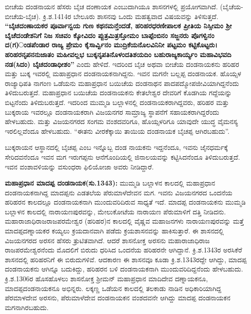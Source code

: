 ಬೀಚೆಯ ದಂಡನಾಯನ ಹೆಸರು ಬೈಚ ದಂಣಾಯಕ ಎಂಬುದಾಗಿಯೂ ಶಾಸನಗಳಲ್ಲಿ ಪ್ರಯೋಗವಾಗಿದೆ. (ಬೈಚೆಯ-ಬೀಚೆಯ-ಬೈಚ). ಕ್ರಿ.ಶ.1414ರ ಬೇಲೂರು ಶಾಸನವು ಒಂದು ಮಹತ್ವವಾದ ವಿಷಯವನ್ನು ತಿಳಿಸುತ್ತದೆ. \textbf{“ಬೈಚದಂಣಾಯಕರ ಪೂರ್ವಾನ್ವಯ ಗುಣ ಕಥನಮನ್ತೆಂದಡೆ, ಹರಿಹರಧರಣೀಪಾಲಕ ಪ್ರೀತಿಯ ನಿಸ್ಸೀಮಂ ಶ‍್ರೀ ಬೈಚೆದಂಡೇಶ\-ನಿಗೆ ನಿಜ ಸಚಿವಂ ಕ್ಕೋವಿದಂ ಪ್ಪುತ್ರಮಿತ್ರಸ್ತೋಮಂ ಬಾಪ್ಪೆಂಬಿನಂ ಸಜ್ಜನರು ಪೊಗಳ್ವಿನಂ ದ(ಗ)ಂಡಪೆಂಡಾರ ರಾಜ್ಯ ಪ್ರೇಮಂ ಕೈಸಾರ್ವ್ವಿನಂ ಮುದ್ರಿಕೆಯನೊಲವಿನಿನೀ ಪಟ್ಟಮಂ ಕಟ್ಟಿಕೊಟ್ಟರು। ಹರಿಹರನೃಪನನುಜಾತಂ ಮಹೀವಲ್ಲಭ ಬುಕ್ಕನೃಪತಿನೊಳಂ\-ದತಿಶಯದಿಂ ಬಹುರಾಜ್ಯಕಾರ್ಯ್ಯಂ ಮಹಾವಿಭವದಿ ನಡ(ಸಿದಂ) ಬೈಚದಂಡಾಧೀಶಂ”} ಎಂದು ಹೇಳಿದೆ. ಇದರಿಂದ ಬೈಚ ಅಥವಾ ಬೀಚೆಯ ದಂಡನಾಯಕನು ಹರಿಹರ ಮತ್ತು ಬುಕ್ಕ ಇವರಲ್ಲಿ ಮಹಾಪ್ರಧಾನ ದಂಡನಾಯಕನಾಗಿದ್ದನು. ಇವನ ಮಗನೇ ಬಲ್ಲಪ್ಪ ದಂಡನಾಯಕ. ಹೊಯ್ಸಳ ರಾಜ್ಯಾಧಿಪತಿ ನಾಗಂಣ ಒಡೆಯನು ಮಹಾಪ್ರಧಾನ ಬಯಿಚೆಯ ದಂಡನಾಥನ ಪಾದಪದ್ಮೋಪಜೀವಿಯಾಗಿದ್ದನೆಂದು ತಿಳಿದುಬರುತ್ತದೆ. ಮಹಾಪ್ರಧಾನ ಬಯಿಚೆಯ ದಂಡನಾಯಕನು ಕೇತಲೇಶ್ವರ ದೇವರಿಗೆ ಕೊಡಗಿಯ ಗದ್ದೆಯನ್ನು ಬಿಟ್ಟನೆಂದು ತಿಳಿದುಬರುತ್ತದೆ. ಇದರಿಂದ ಮುಮ್ಮಡಿ ಬಲ್ಲಾಳನಲ್ಲಿ ದಂಡನಾಯಕರಾಗಿ\-ದ್ದವರು, ಹರಿಹರ ಮತ್ತು ಬುಕ್ಕರಾಯ ಇವರಲ್ಲೂ ದಂಡನಾಯಕರಾಗಿ ವಿಜಯನಗರ ಸಾಮ್ರಾಜ್ಯ ಸ್ಥಾಪನೆಗೆ ಸಹಾಯಕರಾಗಿ\-ದ್ದರೆಂದು ಹೇಳಬಹುದು. ಮತ್ತು ವಿಜಯನಗರದ ಸಂಗಮ ವಂಶದವರಿಗೂ, ಹೊಯ್ಸಳರಿಗೂ ಯಾವುದೇ ಯುದ್ಧ ವೈಮನಸ್ಯ ಇರಲಿಲ್ಲವೆಂದೂ ಹೇಳಬಹುದು. “ಈತನು ವೀರಕೆಕ್ಕಾಯಿ ತಾಯಿಯ ದಂಡನಾಯಕ ಬೈಚಪ್ಪ ಆಗಿರಬಹುದು”.

\vskip 2pt

ಬುಕ್ಕರಾಯನ ಆಸ್ಥಾನದಲ್ಲಿ ಬೈಚಪ್ಪ ಎಂಬ ಇನ್ನೊಬ್ಬ ದಂಡ ನಾಯಕನು ಇದ್ದನೆಂದೂ, ಇವನು ಜೈನಧರ್ಮಕ್ಕೆ ಸೇರಿದವನೆಂದೂ ಇವನ ಮಗ ಇರುಗಪ್ಪನು ಆನೆಗೊಂದಿಯಲ್ಲಿ ಜಿನಾಲಯವನ್ನು ಕಟ್ಟಿಸಿದನೆಂದೂ ತಿಳಿದುಬರುತ್ತದೆ. ಇವನ ವಂಶಾವಳಿಯನ್ನು ವಸುಂಧರಾ ಫಿಲಿಯೋಜಾ ಅವರು ನೀಡಿದ್ದಾರೆ.

\vskip 2pt

\textbf{ಮಹಾಪ್ರಧಾನ ಮಾದಪ್ಪ ದಂಡನಾಯಕ(ಸು.1343):} ಮುಮ್ಮಡಿ ಬಲ್ಲಾಳನ ಕಾಲದಲ್ಲಿ ಮಹಾಪ್ರಧಾನ ದಂಡ\-ನಾಯಕ\-ನಾಗಿದ್ದ ಮಾದಪ್ಪನು ಎಡತಲೆಯ ಪೆರುಮಾಳೆದೇವನ ಮಗ. ಇವನು ವಿಜಯನಗರದ ಒಂದನೆಯ ಹರಿಹರನ ಕಾಲದಲ್ಲೂ ದಂಡನಾಯಕನಾಗಿ ಮುಂದುವರಿದಿರುವ ಸಾಧ್ಯತೆ ಇದೆ. ಮಾದಪ್ಪ ದಂಡನಾಯಕನು ಮುಮ್ಮಡಿ ಬಲ್ಲಾಳನ ಕಾಲದಲ್ಲಿ ನಾರಾಯಣಪುರವನ್ನು, ಮೇಲುಕೋಟೆಯ ನಾರಾಯಣ ಪೆರುಮಾಳಿಗೆ ದತ್ತಿ ನೀಡಿದನು. ಮಹಾರಾಜಾಧಿರಾಜ\break ರಾಜಪರಮೇಶ್ವರ (ಹರಿಹರ)ನ ಕಾಲದಲ್ಲಿ ವೈಷ್ಣವ ಮಹಾಜನಗಳು ನಾರಾಯಣಪುರವನ್ನು ಮತ್ತೆ ಮಾದಪ್ಪದಣ್ನಾಯಕರ ಕಯ್ಯಲು ಕ್ರಯದಾನವಾಗಿ ಪಡೆದು ಕ್ರಯಶಾಸನವನ್ನು ಹಾಕಿಸುತ್ತಾರೆ. ಈ ಶಾಸನದಲ್ಲಿ ವಿಜಯನಗರದ ಅರಸನ ಹೆಸರು ತ್ರುಟಿತವಾಗಿದೆ. ಆದರೆ ಶಾಸನೋಕ್ತ ಅರಸನು ಮಹಾರಾಜಾಧಿರಾಜ ರಾಜಪರಮೇಶ್ವರನೆಂದು ಮೊದಲಿಗೆ ಬಿರುದು ಧರಿಸಿದ ಒಂದನೆಯ ಹರಿಹರನೇ ಆಗಿದ್ದಾನೆ. ಕ್ರಿ.ಶ.1343ರ ಅರಸಿಕೆರೆ ಶಾಸನದಲ್ಲಿ ಹರಿಹರನಿಗೆ ಈ ಬಿರುದುಗಳಿವೆ. ಆದಕಾರಣ ಈ ಶಾಸನವೂ ಕೂಡಾ ಕ್ರಿ.ಶ.1343ರದ್ದೇ ಆಗಿದ್ದು, ಮಾದಪ್ಪ ದಂಡನಾಯಕನು ಆಗಿನ್ನೂ ಬದುಕಿದ್ದು, ಹರಿಹರನ ಬಳಿ ದಂಡನಾಯಕನಾಗಿ ಮುಂದುವರಿದಿದ್ದನೆಂದು ಹೇಳಬಹುದು. ಕ್ರಿ.ಶ.1306ರ ಹೊಸಹೊಳಲು ಶಾಸನೋಕ್ತ ಶ‍್ರೀಮನ್​ ಮಹಾಪ್ರಧಾನ ಮಾದಿದೇವ ದಣ್ನಾಯಕನೂ, ಮಾದಪ್ಪದಂಡನಾಯಕನೂ ಅಭಿನ್ನರು. ಲಕ್ಕಣ್ಣ ಒಡೆಯನ ಕಾಲದಲ್ಲಿ ತಲಕಾಡು ನಾಡಿನ ಅಧಿಕಾರಿಯಾಗಿದ್ದ ಪೆರಮಾಳದೇವ ಅರಸನು, ಪೆರುಮಾಳೆದೇವ ದಂಡನಾಯಕನ ವಂಶದವನೇ ಆಗಿದ್ದು ಮಾದಪ್ಪ ದಂಡನಾಯಕನ ಮಗನಾಗಿರಬಹುದು.

